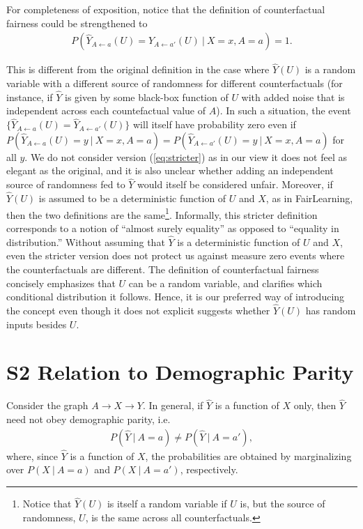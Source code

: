  For completeness of exposition,
notice that the definition of counterfactual fairness could be
strengthened to
\begin{align}
  \label{eq:stricter}
  P(\hat Y_{A \leftarrow a}(U) = \hat Y_{A \leftarrow a'}(U)\ |\ X = x, A = a) = 1.
\end{align}

\noindent This is different from the original definition in the case
where $\hat Y(U)$ is a random variable with a different source of
randomness for different counterfactuals (for instance, if $\hat Y$ is
given by some black-box function of $U$ with added noise that is
independent across each countefactual value of $A$). In such a
situation, the event $\{\hat Y_{A \leftarrow a}(U) = \hat Y_{A
  \leftarrow a'}(U)\}$ will itself have probability zero even if
$P(\hat Y_{A \leftarrow a}(U) = y\ |\ X = x, A = a) = P(\hat Y_{A
  \leftarrow a'}(U) = y\ |\ X = x, A = a)$ for all $y$. We do not
consider version (\ref{eq:stricter}) as in our view it does not feel
as elegant as the original, and it is also unclear whether adding an
independent source of randomness fed to $\hat Y$ would itself be
considered unfair. Moreover, if $\hat Y(U)$ is assumed to be a
deterministic function of $U$ and $X$, as in {\sc FairLearning}, then
the two definitions are the same\footnote{Notice that $\hat Y(U)$ is
  itself a random variable if $U$ is, but the source of randomness,
  $U$, is the same across all counterfactuals.}. Informally, this
stricter definition corresponds to a notion of ``almost surely
equality'' as opposed to ``equality in distribution.'' Without
assuming that $\hat Y$ is a deterministic function of $U$ and $X$,
even the stricter version does not protect us against measure zero events
where the counterfactuals are different. The definition of
counterfactual fairness concisely emphasizes that $U$ can be a random
variable, and clarifies which conditional distribution it follows. Hence, it is our
preferred way of introducing the concept even though it does not
explicit suggests whether $\hat Y(U)$ has random inputs besides $U$.

\section*{S2 Relation to Demographic Parity}
%
Consider the graph $A \rightarrow X \rightarrow Y$. In general, if
$\hat Y$ is a function of $X$ only, then $\hat Y$ need not obey
demographic parity, i.e.
\begin{align}
  P(\hat Y\ |\ A = a) \neq P(\hat Y\ |\ A = a'),\nonumber
\end{align}
\noindent where, since $\hat Y$ is a function of $X$, the
probabilities are obtained by marginalizing over $P(X\ |\ A = a)$ and
$P(X\ |\ A = a')$, respectively.

